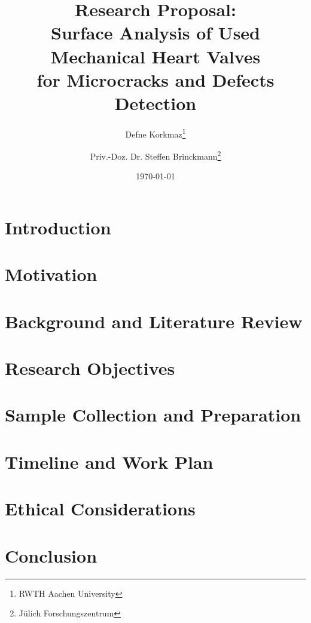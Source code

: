 \documentclass{article}
\title{Research Proposal:\\Surface Analysis of Used Mechanical Heart Valves\\for Microcracks and Defects Detection}
\author{Defne Korkmaz\thanks{RWTH Aachen University} \and Priv.-Doz. Dr. Steffen Brinckmann\thanks{Jülich Forschungszentrum}}
\date{\today}
\begin{document}
\maketitle
\vfill

\pagebreak
\section{Introduction}


\section{Motivation}


\section{Background and Literature Review}

\pagebreak

\section{Research Objectives}


\section{Sample Collection and Preparation}


\section{Timeline and Work Plan}


\section{Ethical Considerations}


\section{Conclusion}


\pagebreak
\printbibliography
\end{document}
